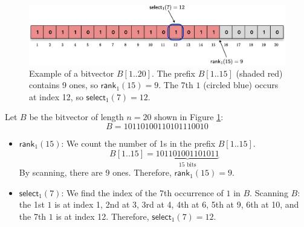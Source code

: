 \begin{figure}[htbp]
    \includegraphics[width=\textwidth]{assets/rank_select_3.pdf}
    \caption{Example of a bitvector $B[1..20]$. The prefix $B[1..15]$ (shaded red) contains 9 ones, so $\textsf{rank}_1(15)=9$. The 7th $1$ (circled blue) occurs at index 12, so $\textsf{select}_1(7)=12$.}
    \label{fig:bitvector_example}
\end{figure}

\begin{example}
    Let $B$ be the bitvector of length $n=20$ shown in Figure \ref{fig:bitvector_example}:
    \begin{equation*}
        B = 10110100110101110010
    \end{equation*}
    \begin{itemize}
        \item $\textsf{rank}_1(15)$: We count the number of 1s in the prefix $B[1..15]$.
              \begin{equation*}
                  B[1..15] = \underbrace{101101001101011}_{15 \text{ bits}}
              \end{equation*}
              By scanning, there are 9 ones. Therefore, $\textsf{rank}_1(15) = 9$.

        \item $\textsf{select}_1(7)$: We find the index of the 7th occurrence of $1$ in $B$.
              Scanning $B$: the 1st $1$ is at index 1, 2nd at 3, 3rd at 4, 4th at 6, 5th at 9, 6th at 10, and the 7th $1$ is at index 12.
              Therefore, $\textsf{select}_1(7) = 12$.
    \end{itemize}
\end{example}

